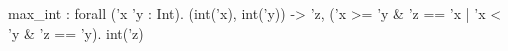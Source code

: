 max_int : forall ('x 'y : Int). (int('x), int('y)) -> {'z, ('x >= 'y & 'z == 'x | 'x < 'y & 'z == 'y). int('z)}